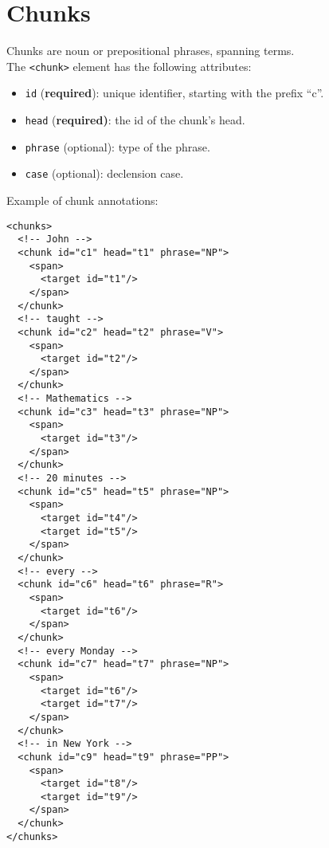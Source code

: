 
\section{Chunks}
\label{sec:chunks}

Chunks are noun or prepositional phrases, spanning terms.\\

The \texttt{<chunk>} element has the following attributes:
\begin{itemize}
\item \texttt{id} (\textbf{required}): unique identifier, starting with the prefix ``c''.
\item \texttt{head} (\textbf{required)}: the id of the chunk's head.
\item \texttt{phrase} (optional): type of the phrase.
\item \texttt{case} (optional): declension case.
\end{itemize}

Example of chunk annotations:
\begin{Verbatim}[fontsize=\small]
<chunks>
  <!-- John -->
  <chunk id="c1" head="t1" phrase="NP">
    <span>
      <target id="t1"/>
    </span>
  </chunk>
  <!-- taught -->
  <chunk id="c2" head="t2" phrase="V">
    <span>
      <target id="t2"/>
    </span>
  </chunk>
  <!-- Mathematics -->
  <chunk id="c3" head="t3" phrase="NP">
    <span>
      <target id="t3"/>
    </span>
  </chunk>
  <!-- 20 minutes -->
  <chunk id="c5" head="t5" phrase="NP">
    <span>
      <target id="t4"/>
      <target id="t5"/>
    </span>
  </chunk>
  <!-- every -->
  <chunk id="c6" head="t6" phrase="R">
    <span>
      <target id="t6"/>
    </span>
  </chunk>
  <!-- every Monday -->
  <chunk id="c7" head="t7" phrase="NP">
    <span>
      <target id="t6"/>
      <target id="t7"/>
    </span>
  </chunk>
  <!-- in New York -->
  <chunk id="c9" head="t9" phrase="PP">
    <span>
      <target id="t8"/>
      <target id="t9"/>
    </span>
  </chunk>
</chunks>
\end{Verbatim}


